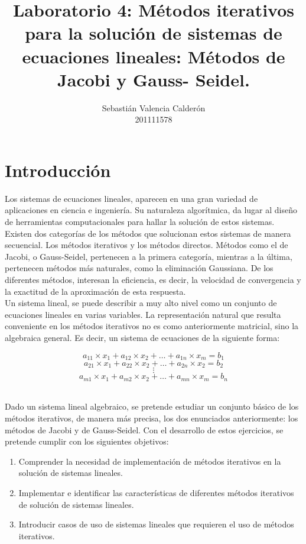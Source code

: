 \documentclass[11pt, spanish]{article}
\date{}
\begin{document}
\renewcommand\lstlistlistingname{Lista de Scripts}

\author{Sebastián Valencia Calderón \\ 201111578}
\title{Laboratorio 4: Métodos iterativos para la solución de sistemas de ecuaciones lineales: Métodos de Jacobi y Gauss- Seidel.}
\maketitle

\section{Introducción}

Los sistemas de ecuaciones lineales, aparecen en una gran variedad de aplicaciones en ciencia e ingeniería. Su naturaleza algorítmica, da lugar al diseño de herramientas computacionales para hallar la solución de estos sistemas. Existen dos categorías de los métodos que solucionan estos sistemas de manera secuencial. Los métodos iterativos y los métodos directos. Métodos como el de Jacobi, o Gauss-Seidel, pertenecen a la primera categoría, mientras a la última, pertenecen métodos más naturales, como la eliminación Gaussiana. De los diferentes métodos, interesan la eficiencia, es decir, la velocidad de convergencia y la exactitud de la aproximación de esta respuesta.\\

Un sistema lineal, se puede describir a muy alto nivel como un conjunto de ecuaciones lineales en varias variables. La representación natural que resulta conveniente en los métodos iterativos no es como anteriormente matricial, sino la algebraica general. Es decir, un sistema de ecuaciones de la siguiente forma:

$$ a_{11} \times x_1 + a_{12} \times x_2 + \dots + a_{1n} \times x_m = b_1 $$
$$ a_{21} \times x_1 + a_{22} \times x_2 + \dots + a_{2n} \times x_2 = b_2 $$
$$ \vdots $$
$$ a_{m1} \times x_1 + a_{m2} \times x_2 + \dots + a_{mn} \times x_m = b_n $$ \


Dado un sistema lineal algebraico, se pretende estudiar un conjunto básico de los métodos iterativos, de manera más precisa, los dos enunciados anteriormente: los métodos de Jacobi y de Gauss-Seidel. Con el desarrollo de estos ejercicios, se pretende cumplir con los siguientes objetivos:

\begin{enumerate}
\item Comprender la necesidad de implementación de métodos iterativos en la solución de sistemas lineales.
\item Implementar e identificar las características de diferentes métodos iterativos de solución de sistemas lineales.
\item Introducir casos de uso de sistemas lineales que requieren el uso de métodos iterativos.
\end{enumerate}
\end{document}
